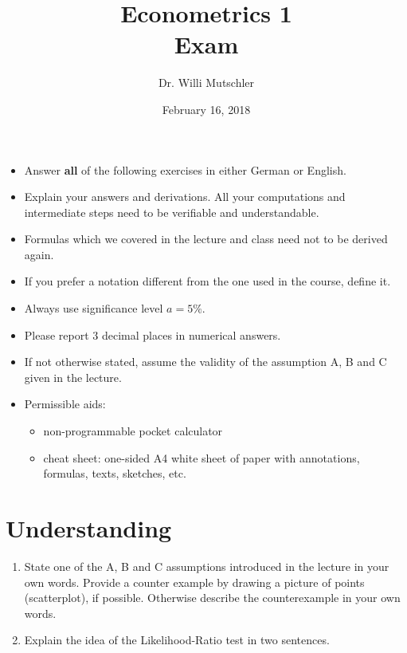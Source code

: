 \documentclass{article}
\begin{document}
	
	\title{Econometrics 1 \\ \small Exam}
	\author{Dr. Willi Mutschler}
	\date{February 16, 2018}
	\maketitle
	
	\begin{itemize}
		\item Answer \textbf{all} of the following exercises in either German or English.
		\item Explain your answers and derivations. All your computations and intermediate steps need to be verifiable and understandable. 
		\item Formulas which we covered in the lecture and class need not to be derived again.
		\item If you prefer a notation different from the one used in the course, define it.
		\item Always use significance level $a=5\%$.
		\item Please report 3 decimal places in numerical answers.
		\item If not otherwise stated, assume the validity of the assumption A, B and C given in the lecture.
		\item Permissible aids:
		\begin{itemize}
			\item non-programmable pocket calculator
			\item cheat sheet: one-sided A4 white sheet of paper with annotations, formulas, texts, sketches, etc.
		\end{itemize}
	\end{itemize}
\thispagestyle{empty}

\newpage
\setcounter{page}{1}
\section{Understanding}
\begin{enumerate}[label=(\alph*)]
	\item State one of the A, B and C assumptions introduced in the lecture in your own words. Provide a counter example by drawing a picture of points (scatterplot), if possible. Otherwise describe the counterexample in your own words.
	\item Explain the idea of the Likelihood-Ratio test in two	sentences.
	
\end{enumerate}
\end{document}
